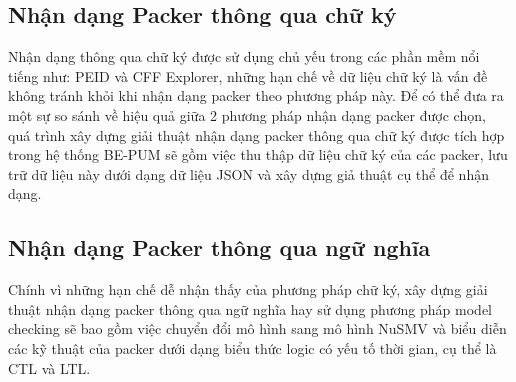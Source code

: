 \subsection {Nhận dạng Packer thông qua chữ ký}

\hspace{0.5cm}Nhận dạng thông qua chữ ký được sử dụng chủ yếu trong các phần mềm nổi tiếng như: PEID và CFF Explorer, những hạn chế về dữ liệu chữ ký là vấn đề không tránh khỏi khi nhận dạng packer theo phương pháp này. Để có thể đưa ra một sự so sánh về hiệu quả giữa 2 phương pháp nhận dạng packer được chọn, quá trình xây dựng giải thuật nhận dạng packer thông qua chữ ký được tích hợp trong hệ thống BE-PUM sẽ gồm việc thu thập dữ liệu chữ ký của các packer, lưu trữ dữ liệu này dưới dạng dữ liệu JSON và xây dựng giả thuật cụ thể để nhận dạng. 

\subsection {Nhận dạng Packer thông qua ngữ nghĩa}

\hspace{0.5cm}Chính vì những hạn chế dễ nhận thấy của phương pháp chữ ký, xây dựng giải thuật nhận dạng packer thông qua ngữ nghĩa hay sử dụng phương pháp model checking sẽ bao gồm việc chuyển đổi mô hình sang mô hình NuSMV và biểu diễn các kỹ thuật của packer dưới dạng biểu thức logic có yếu tố thời gian, cụ thể là CTL và LTL.

